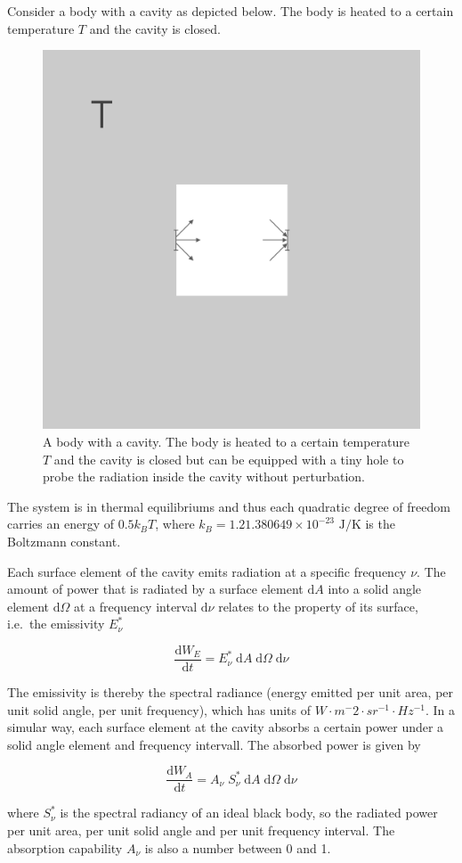\documentclass[
  a4paper,
]{book}
\begin{document}
Consider a body with a cavity as depicted below. The body is heated to a
certain temperature \(T\) and the cavity is closed.

\begin{figure}[H]

{\centering \includegraphics[width=0.35\linewidth,height=\textheight,keepaspectratio]{quantum-mechanics/img/cavity.png}

}

\caption{A body with a cavity. The body is heated to a certain
temperature \(T\) and the cavity is closed but can be equipped with a
tiny hole to probe the radiation inside the cavity without
perturbation.}

\end{figure}%

The system is in thermal equilibriums and thus each quadratic degree of
freedom carries an energy of \(0.5 k_B T\), where
\(k_B=1.21.380649 \times 10^{-23} \text{ J/K}\) is the Boltzmann
constant.

Each surface element of the cavity emits radiation at a specific
frequency \(\nu\). The amount of power that is radiated by a surface
element \(\mathrm{d} A\) into a solid angle element
\(\mathrm{d} \Omega\) at a frequency interval \(\mathrm{d} \nu\) relates
to the property of its surface, i.e.~the emissivity \(E^{\ast}_{\nu}\)

\[
\frac{\mathrm{d} W_{E}}{\mathrm{d} t} = E^{\ast}_{\nu} \; \mathrm{d} A \; \mathrm{d} \Omega \; \mathrm{d} \nu
\]

The emissivity is thereby the spectral radiance (energy emitted per unit
area, per unit solid angle, per unit frequency), which has units of
\(W⋅m^-2⋅sr^{-1}⋅Hz^{-1}\). In a simular way, each surface element at
the cavity absorbs a certain power under a solid angle element and
frequency intervall. The absorbed power is given by

\[
\frac{\mathrm{d} W_{A}}{\mathrm{d} t} = A_{\nu} \; S^{\ast}_{\nu} \; \mathrm{d} A \; \mathrm{d} \Omega \; \mathrm{d} \nu
\]

where \(S^{\ast}_{\nu}\) is the spectral radiancy of an ideal black
body, so the radiated power per unit area, per unit solid angle and per
unit frequency interval. The absorption capability \(A_{\nu}\) is also a
number between 0 and 1.
\end{document}

